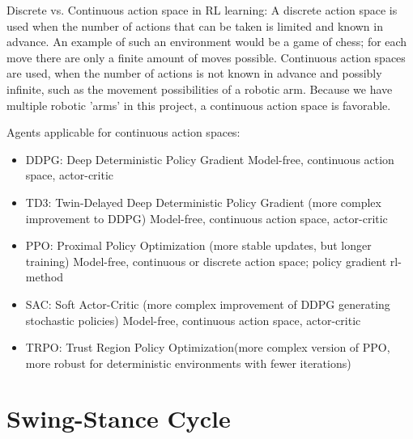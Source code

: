 Discrete vs. Continuous action space in RL learning: 
A discrete action space is used when the number of actions that can be taken is limited and known in advance. An example of such an environment would be a game of chess; for each move there are only a finite amount of moves possible.
Continuous action spaces are used, when the number of actions is not known in advance and possibly infinite, such as the movement possibilities of a robotic arm.
Because we have multiple robotic 'arms' in this project, a continuous action space is favorable.



Agents applicable for continuous action spaces: 
\begin{itemize}		
	\item DDPG: Deep Deterministic Policy Gradient
	Model-free, continuous action space, actor-critic
	\item TD3: Twin-Delayed Deep Deterministic Policy Gradient (more complex improvement to DDPG)
	Model-free, continuous action space, actor-critic
	\item PPO: Proximal Policy Optimization (more stable updates, but longer training)
	Model-free, continuous or discrete action space; policy gradient rl-method
	\item SAC: Soft Actor-Critic (more complex improvement of DDPG generating stochastic policies)
	Model-free, continuous action space, actor-critic
	\item TRPO: Trust Region Policy Optimization(more complex version of PPO, more robust for deterministic environments with fewer iterations)
\end{itemize}\parencite{MATLAB}


\section{Swing-Stance Cycle}
